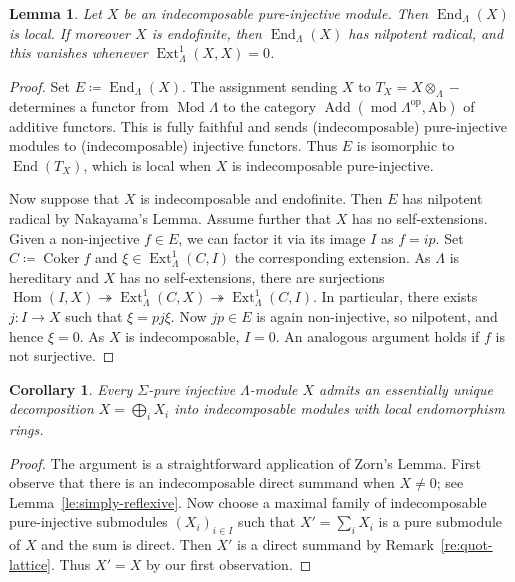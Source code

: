 \documentclass[a4paper]{amsart}
\theoremstyle{plain}
\newtheorem{lem}[thm]{Lemma}
\newtheorem{cor}[thm]{Corollary}
\theoremstyle{definition}
\theoremstyle{remark}
\numberwithin{equation}{section}
\newcommand{\Add}{\operatorname{Add}}
\newcommand{\Coker}{\operatorname{Coker}}
\newcommand{\End}{\operatorname{End}}
\newcommand{\Ext}{\operatorname{Ext}}
\newcommand{\Hom}{\operatorname{Hom}}
\renewcommand{\mod}{\operatorname{mod}}
\newcommand{\Mod}{\operatorname{Mod}}
\newcommand{\Ab}{\mathrm{Ab}}
\newcommand{\op}{\mathrm{op}}
\begin{document}
\begin{lem}\label{le:end-generic}
Let $X$ be an indecomposable pure-injective module. Then $\End_\Lambda(X)$ is local. If moreover $X$ is endofinite, then $\End_\Lambda(X)$ has nilpotent radical, and this vanishes whenever $\Ext^1_\Lambda(X,X)=0$.
\end{lem}

\begin{proof}
Set $E\coloneqq\End_\Lambda(X)$. The assignment sending $X$ to $T_X=X\otimes_\Lambda-$ determines a functor from $\Mod\Lambda$ to the category $\Add(\mod\Lambda^\op,\Ab)$ of additive functors. This is fully faithful and sends (indecomposable) pure-injective modules to (indecomposable) injective functors. Thus $E$ is isomorphic to $\End(T_X)$, which is local when $X$ is indecomposable pure-injective.

Now suppose that $X$ is indecomposable and endofinite. Then $E$ has nilpotent radical by Nakayama's Lemma. Assume further that $X$ has no self-extensions. Given a non-injective $f\in E$, we can factor it via its image $I$ as $f=ip$. Set $C\coloneqq\Coker f$ and $\xi\in\Ext^1_\Lambda(C,I)$ the corresponding extension. As $\Lambda$ is hereditary and $X$ has no self-extensions, there are surjections $\Hom(I,X)\twoheadrightarrow\Ext^1_\Lambda(C,X)\twoheadrightarrow\Ext^1_\Lambda(C,I)$. In particular, there exists $j\colon I\to X$ such that $\xi=pj\xi$. Now $jp\in E$ is again non-injective, so nilpotent, and hence $\xi=0$. As $X$ is indecomposable, $I=0$. An analogous argument holds if $f$ is not surjective.
\end{proof}

\begin{cor}\label{co:decomposition}
Every $\Sigma$-pure injective $\Lambda$-module $X$ admits an essentially unique decomposition $X=\bigoplus_i X_i$ into indecomposable modules with local endomorphism rings.
\end{cor}

\begin{proof}
The argument is a straightforward application of Zorn's Lemma. First observe that there is an indecomposable direct summand when $X\neq 0$; see Lemma~\ref{le:simply-reflexive}. Now choose a maximal family of indecomposable pure-injective submodules $(X_i)_{i\in I}$ such that $X'=\sum_iX_i$ is a pure submodule of $X$ and the sum is direct. Then $X'$ is a direct summand by Remark~\ref{re:quot-lattice}. Thus $X'=X$ by our first observation.
\end{proof}
\end{document}
